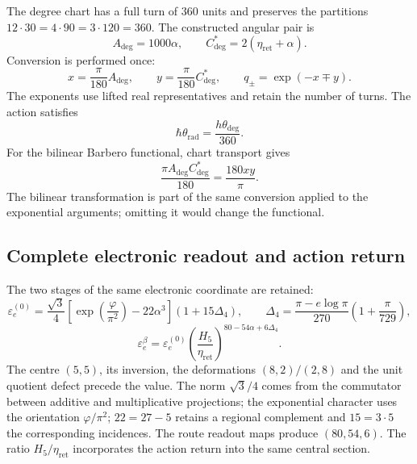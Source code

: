 The degree chart has a full turn of $360$ units and preserves the
partitions $12\cdot30=4\cdot90=3\cdot120=360$. The constructed angular pair is
\begin{equation}
 A_{\deg}=1000\alpha,
 \qquad C^*_{\deg}=2(\eta_{\mathrm{ret}}+\alpha).
 \label{md:compos:par-angular}
\end{equation}
Conversion is performed once:
\begin{equation}
 x=\frac{\pi}{180}A_{\deg},\qquad
 y=\frac{\pi}{180}C^*_{\deg},\qquad
 q_\pm=\exp(-x\mp y).
 \label{md:compos:canales}
\end{equation}
The exponents use lifted real representatives and retain the number of
turns. The action satisfies
\begin{equation}
 \hbar\theta_{\mathrm{rad}}
 =\frac{h\theta_{\deg}}{360}.
 \label{md:compos:accion-cartas}
\end{equation}
For the bilinear Barbero functional, chart transport gives
\begin{equation}
 \frac{\pi A_{\deg}C^*_{\deg}}{180}
 =\frac{180xy}{\pi}.
 \label{md:compos:bilineal-cartas}
\end{equation}
The bilinear transformation is part of the same conversion applied to the
exponential arguments; omitting it would change the functional.

\subsection{Complete electronic readout and action return}
\label{md:compos:electron}

The two stages of the same electronic coordinate are retained:
\begin{equation}
 \varepsilon_e^{(0)}=\frac{\sqrt{3}}{4}
 \left[\exp\!\left(\frac{\varphi}{\pi^2}\right)-22\alpha^3\right]
 (1+15\Delta_4),\qquad
 \Delta_4=\frac{\pi-e\log\pi}{270}
 \left(1+\frac{\pi}{729}\right),
 \label{md:compos:electron-basal}
\end{equation}
\begin{equation}
 \boxed{\varepsilon_e^\beta=\varepsilon_e^{(0)}
 \left(\frac{H_5}{\eta_{\mathrm{ret}}}\right)^{80-54\alpha+6\Delta_4}.}
 \label{md:compos:electron-completo}
\end{equation}
The centre $(5,5)$, its inversion, the deformations $(8,2)/(2,8)$ and the
unit quotient defect precede the value. The norm $\sqrt{3}/4$ comes from the
commutator between additive and multiplicative projections; the exponential
character uses the orientation $\varphi/\pi^2$; $22=27-5$ retains a regional
complement and $15=3\cdot5$ the corresponding incidences. The route readout
maps produce $(80,54,6)$. The ratio $H_5/\eta_{\mathrm{ret}}$ incorporates
the action return into the same central section.

